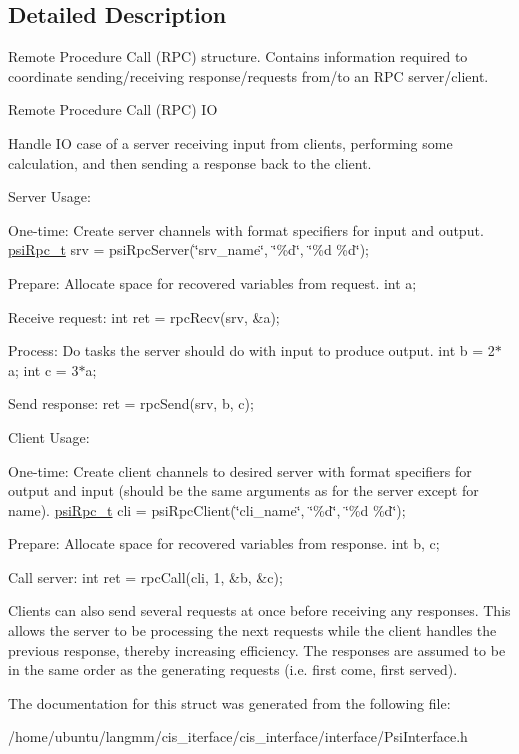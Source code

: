 \subsection{Detailed Description}
Remote Procedure Call (R\+PC) structure. Contains information required to coordinate sending/receiving response/requests from/to an R\+PC server/client. 

Remote Procedure Call (R\+PC) IO

Handle IO case of a server receiving input from clients, performing some calculation, and then sending a response back to the client.

Server Usage\+:
\begin{DoxyEnumerate}
\item One-\/time\+: Create server channels with format specifiers for input and output. \hyperlink{structpsiRpc__t}{psi\+Rpc\+\_\+t} srv = psi\+Rpc\+Server(\char`\"{}srv\+\_\+name\char`\"{}, \char`\"{}\%d\char`\"{}, \char`\"{}\%d \%d\char`\"{});
\item Prepare\+: Allocate space for recovered variables from request. int a;
\item Receive request\+: int ret = rpc\+Recv(srv, \&a);
\item Process\+: Do tasks the server should do with input to produce output. int b = 2$\ast$a; int c = 3$\ast$a;
\end{DoxyEnumerate}
\begin{DoxyEnumerate}
\item Send response\+: ret = rpc\+Send(srv, b, c);
\end{DoxyEnumerate}

Client Usage\+:
\begin{DoxyEnumerate}
\item One-\/time\+: Create client channels to desired server with format specifiers for output and input (should be the same arguments as for the server except for name). \hyperlink{structpsiRpc__t}{psi\+Rpc\+\_\+t} cli = psi\+Rpc\+Client(\char`\"{}cli\+\_\+name\char`\"{}, \char`\"{}\%d\char`\"{}, \char`\"{}\%d \%d\char`\"{});
\item Prepare\+: Allocate space for recovered variables from response. int b, c;
\item Call server\+: int ret = rpc\+Call(cli, 1, \&b, \&c);
\end{DoxyEnumerate}

Clients can also send several requests at once before receiving any responses. This allows the server to be processing the next requests while the client handles the previous response, thereby increasing efficiency. The responses are assumed to be in the same order as the generating requests (i.\+e. first come, first served). 

The documentation for this struct was generated from the following file\+:\begin{DoxyCompactItemize}
\item 
/home/ubuntu/langmm/cis\+\_\+iterface/cis\+\_\+interface/interface/Psi\+Interface.\+h\end{DoxyCompactItemize}
